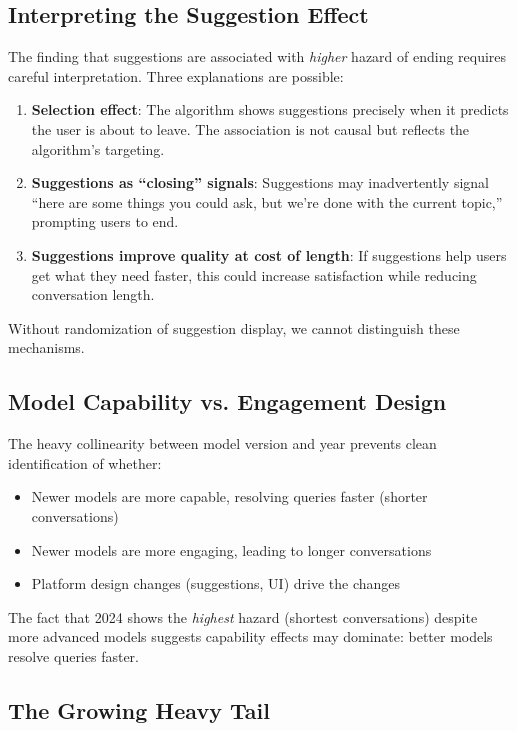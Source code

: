 \documentclass[11pt]{article}
\begin{document}
\subsection{Interpreting the Suggestion Effect}

The finding that suggestions are associated with \textit{higher} hazard of ending requires careful interpretation. Three explanations are possible:

\begin{enumerate}
    \item \textbf{Selection effect}: The algorithm shows suggestions precisely when it predicts the user is about to leave. The association is not causal but reflects the algorithm's targeting.

    \item \textbf{Suggestions as ``closing'' signals}: Suggestions may inadvertently signal ``here are some things you could ask, but we're done with the current topic,'' prompting users to end.

    \item \textbf{Suggestions improve quality at cost of length}: If suggestions help users get what they need faster, this could increase satisfaction while reducing conversation length.
\end{enumerate}

Without randomization of suggestion display, we cannot distinguish these mechanisms.

\subsection{Model Capability vs. Engagement Design}

The heavy collinearity between model version and year prevents clean identification of whether:
\begin{itemize}
    \item Newer models are more capable, resolving queries faster (shorter conversations)
    \item Newer models are more engaging, leading to longer conversations
    \item Platform design changes (suggestions, UI) drive the changes
\end{itemize}

The fact that 2024 shows the \textit{highest} hazard (shortest conversations) despite more advanced models suggests capability effects may dominate: better models resolve queries faster.

\subsection{The Growing Heavy Tail}
\end{document}
